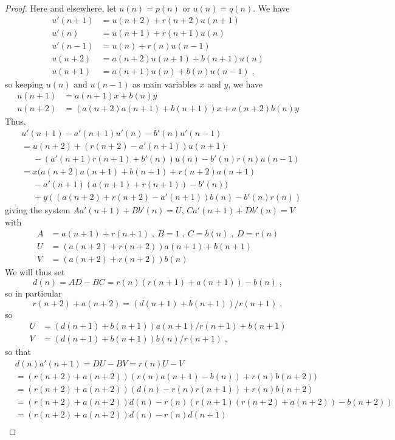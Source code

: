 \documentclass[10pt,a4paper]{amsart}
\begin{document}
\begin{proof} Here and elsewhere, let $u(n)=p(n)$ or $u(n)=q(n)$.
We have
\begin{align*}
  u'(n+1)&=u(n+2)+r(n+2)u(n+1)\\
  u'(n)&=u(n+1)+r(n+1)u(n)\\
  u'(n-1)&=u(n)+r(n)u(n-1)\\
  u(n+2)&=a(n+2)u(n+1)+b(n+1)u(n)\\
  u(n+1)&=a(n+1)u(n)+b(n)u(n-1)\;,\end{align*}
so keeping $u(n)$ and $u(n-1)$ as main variables $x$ and $y$, we have
\begin{align*}
  u(n+1)&=a(n+1)x+b(n)y\\
  u(n+2)&=(a(n+2)a(n+1)+b(n+1))x+a(n+2)b(n)y
\end{align*}
Thus,
\begin{align*}
  &u'(n+1)-a'(n+1)u'(n)-b'(n)u'(n-1)\\
  &=u(n+2)+(r(n+2)-a'(n+1))u(n+1)\\
  &\phantom{=}-(a'(n+1)r(n+1)+b'(n))u(n)-b'(n)r(n)u(n-1)\\
  &=x(a(n+2)a(n+1)+b(n+1)+r(n+2)a(n+1)\\
  &\phantom{=}-a'(n+1)(a(n+1)+r(n+1))-b'(n))\\
  &\phantom{=}+y((a(n+2)+r(n+2)-a'(n+1))b(n)-b'(n)r(n))\end{align*}
giving the system
$Aa'(n+1)+Bb'(n)=U$, $Ca'(n+1)+Db'(n)=V$ with
\begin{align*}
  A&=a(n+1)+r(n+1)\;,\ B=1\;,\ C=b(n)\;,\ D=r(n)\\
  U&=(a(n+2)+r(n+2))a(n+1)+b(n+1)\\
  V&=(a(n+2)+r(n+2))b(n)\end{align*}
We will thus set
$$d(n)=AD-BC=r(n)(r(n+1)+a(n+1))-b(n)\;,$$
so in particular
$$r(n+2)+a(n+2)=(d(n+1)+b(n+1))/r(n+1)\;,$$
so
\begin{align*}
  U&=(d(n+1)+b(n+1))a(n+1)/r(n+1)+b(n+1)\\
  V&=(d(n+1)+b(n+1))b(n)/r(n+1)\;,\end{align*}
so that
\begin{align*}
  &d(n)a'(n+1)=DU-BV=r(n)U-V\\
  &=(r(n+2)+a(n+2))(r(n)a(n+1)-b(n))+r(n)b(n+2))\\
  &=(r(n+2)+a(n+2))(d(n)-r(n)r(n+1))+r(n)b(n+2)\\
  &=(r(n+2)+a(n+2))d(n)-r(n)(r(n+1)(r(n+2)+a(n+2))-b(n+2))\\
  &=(r(n+2)+a(n+2))d(n)-r(n)d(n+1)\\

\end{align*}
\end{proof}
\end{document}
